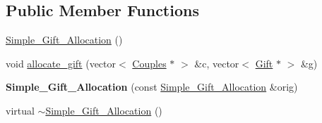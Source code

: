 \subsection*{Public Member Functions}
\begin{DoxyCompactItemize}
\item 
\hyperlink{class_simple___gift___allocation_abd18c61c3a0bfb4129240e8bf32a30dc}{Simple\-\_\-\-Gift\-\_\-\-Allocation} ()
\item 
void \hyperlink{class_simple___gift___allocation_ad2b3d876adcc2edc74d27215d8ec9a3e}{allocate\-\_\-gift} (vector$<$ \hyperlink{class_couples}{Couples} $\ast$ $>$ \&c, vector$<$ \hyperlink{class_gift}{Gift} $\ast$ $>$ \&g)
\item 
\hypertarget{class_simple___gift___allocation_ae5396061e22e63435327d8a6a05246cc}{{\bfseries Simple\-\_\-\-Gift\-\_\-\-Allocation} (const \hyperlink{class_simple___gift___allocation}{Simple\-\_\-\-Gift\-\_\-\-Allocation} \&orig)}\label{class_simple___gift___allocation_ae5396061e22e63435327d8a6a05246cc}

\item 
virtual \hyperlink{class_simple___gift___allocation_a21f5ad020db4af407d62177ee2f81cb6}{$\sim$\-Simple\-\_\-\-Gift\-\_\-\-Allocation} ()
\end{DoxyCompactItemize}


